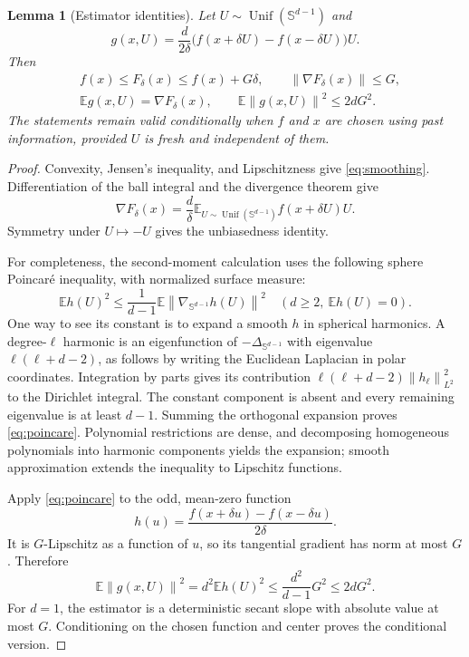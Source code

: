 \documentclass[11pt,a4paper]{article}
\numberwithin{equation}{section}
\newtheorem{lemma}[theorem]{Lemma}
\theoremstyle{remark}
\newcommand{\E}{\mathbb E}
\newcommand{\norm}[1]{\left\lVert #1\right\rVert}
\newcommand{\Sph}{\mathbb S^{d-1}}
\DeclareMathOperator{\Unif}{Unif}
\begin{document}
\begin{lemma}[Estimator identities]\label{lem:estimator}
Let $U\sim\Unif(\Sph)$ and
\[
 g(x,U)=\frac d{2\delta}
       \bigl(f(x+\delta U)-f(x-\delta U)\bigr)U.
\]
Then
\begin{align}
&f(x)\le F_\delta(x)\le f(x)+G\delta,\qquad
 \norm{\nabla F_\delta(x)}\le G, \label{eq:smoothing}\\
&\E g(x,U)=\nabla F_\delta(x),\qquad
 \E\norm{g(x,U)}^2\le 2dG^2. \label{eq:moment}
\end{align}
The statements remain valid conditionally when $f$ and $x$ are chosen
using past information, provided $U$ is fresh and independent of them.
\end{lemma}
\begin{proof}
Convexity, Jensen's inequality, and Lipschitzness give
\eqref{eq:smoothing}. Differentiation of the ball integral and the
divergence theorem give
\[
 \nabla F_\delta(x)=\frac d\delta
       \E_{U\sim\Unif(\Sph)} f(x+\delta U)U.
\]
Symmetry under $U\mapsto-U$ gives the unbiasedness identity.

For completeness, the second-moment calculation uses the following
sphere Poincar\'e inequality, with normalized surface measure:
\begin{equation}
 \E h(U)^2\le\frac1{d-1}\E\norm{\nabla_{\Sph}h(U)}^2
 \quad(d\ge2,\ \E h(U)=0).                    \label{eq:poincare}
\end{equation}
One way to see its constant is to expand a smooth $h$ in spherical
harmonics. A degree-$\ell$ harmonic is an eigenfunction of
$-\Delta_{\Sph}$ with eigenvalue $\ell(\ell+d-2)$, as follows by
writing the Euclidean Laplacian in polar coordinates. Integration by
parts gives its contribution
$\ell(\ell+d-2)\norm{h_\ell}_{L^2}^2$ to the Dirichlet integral.
The constant component is absent and every remaining eigenvalue is at
least $d-1$. Summing the orthogonal expansion proves
\eqref{eq:poincare}. Polynomial restrictions are dense, and decomposing
homogeneous polynomials into harmonic components yields the expansion;
smooth approximation extends the inequality to Lipschitz functions.

Apply \eqref{eq:poincare} to the odd, mean-zero function
\[
 h(u)=\frac{f(x+\delta u)-f(x-\delta u)}{2\delta}.
\]
It is $G$-Lipschitz as a function of $u$, so its tangential gradient has
norm at most $G$. Therefore
\[
 \E\norm{g(x,U)}^2=d^2\E h(U)^2
 \le\frac{d^2}{d-1}G^2\le2dG^2.
\]
For $d=1$, the estimator is a deterministic secant slope with absolute
value at most $G$. Conditioning on the chosen function and center
proves the conditional version.
\end{proof}
\end{document}
